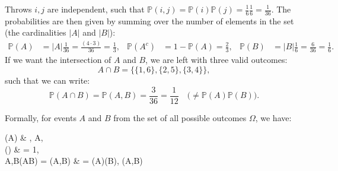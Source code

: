 \documentclass{article}
\begin{document}
\begin{testexample}
\begin{center}
\begin{tabular}{@{}ll|llllll}
\end{tabular}
\hfill
\end{center}
    Throws $i,j$ are independent, such that $\mathbb{P}(i,j)=\mathbb{P}(i)\mathbb{P}(j)=\frac{1}{6}\frac{1}{6}=\frac{1}{36}$. The probabilities are then given by summing over the number of elements in the set (the cardinalities $|A|$ and $|B|$):
    \begin{align*}
        \mathbb{P}(A)&=|A|\frac{1}{36}=\frac{(4\cdot 3)}{36}=\frac{1}{3},& \mathbb{P}(A^c)&=1-\mathbb{P}(A)=\frac{2}{3},&  \mathbb{P}(B)&=|B|\frac{1}{6}=\frac{6}{36}=\frac{1}{6}.
    \end{align*}
    If we want the intersection of $A$ and $B$, we are left with three valid outcomes:
    \begin{equation*}
        A\cap B = \{ \{1,6\},\{2, 5\},\{3,4\} \},
    \end{equation*}
    such that we can write:
    \begin{equation*}
        \mathbb{P}(A\cap B)=\mathbb{P}(A,B)=\frac{3}{36}=\frac{1}{12} \quad \Bigg( \neq \mathbb{P}(A)\mathbb{P}(B) \Bigg).
    \end{equation*}
\end{testexample}
{\flushleft Formally}, for events $A$ and $B$ from the set of all possible outcomes $\Omega$, we have:
\begin{mymathbox}[ams align, title={Probability of events $A,B\in\Omega$}, colframe=blue!30!black, center title]
	(A) & , \quad \forall A\in\Omega,\\
	(\Omega) & = 1,\\
	A,B\Longrightarrow{}(A\cap B) = (A,B) & = (A)(B), \quad \forall (A,B)\in\Omega
\end{mymathbox}
\end{document}
